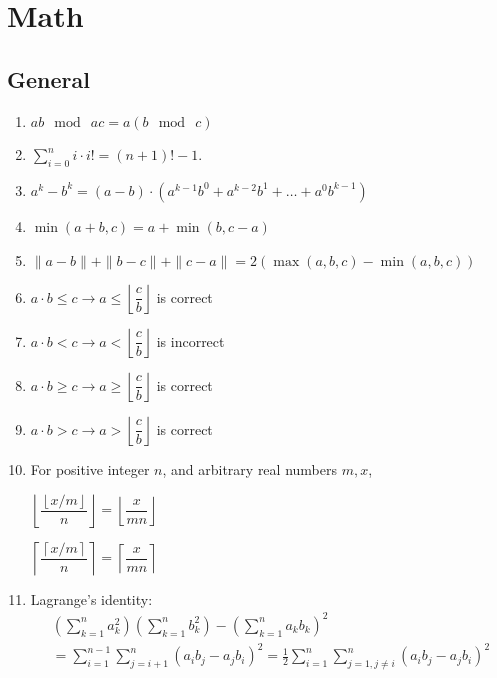 \section{Math}


\subsection{General}
\begin{enumerate}
\item $\displaystyle ab \mod\ ac=a(b \mod\ c)$
\item $\displaystyle \sum_{i = 0}^n{i\cdot i!=(n + 1)! - 1}$.
\item $\displaystyle a^k - b^k = (a - b) \cdot (a^{k - 1}b^0 + a^{k - 2}b^1 +  \ldots  + a^0b^{k - 1})$
\item $\displaystyle \min(a + b, c) = a + \min(b, c - a)$
\item $\|a - b\| + \|b - c\| + \|c - a\| = 2 (\max (a, b, c) - \min (a, b, c))$
\item $\displaystyle a \cdot b \leq c \rightarrow a \leq \left \lfloor \dfrac{c}{b} \right \rfloor$ is correct
\item $\displaystyle a \cdot b < c \rightarrow a <  \left \lfloor \dfrac{c}{b} \right \rfloor$ is incorrect
\item $\displaystyle a \cdot b \geq c \rightarrow a \geq  \left \lfloor \dfrac{c}{b} \right \rfloor$  is correct
\item $\displaystyle a \cdot b > c \rightarrow a >  \left \lfloor \dfrac{c}{b} \right \rfloor$ is correct
\item For positive integer $n$, and arbitrary real numbers $m,x$,
    
    $\displaystyle \left \lfloor \dfrac{\left \lfloor x/m \right \rfloor}{n} \right \rfloor = \left \lfloor \dfrac{x}{mn} \right \rfloor$
    
    $\displaystyle \left \lceil \dfrac{\left \lceil x/m \right \rceil}{n} \right \rceil = \left \lceil \dfrac{x}{mn} \right \rceil$
\item Lagrange's identity:
    \begin{multline*}
        \left(\sum \limits_{k=1}^{n}a_{k}^{2}\right)\left(\sum \limits_{k=1}^{n}b_{k}^{2}\right)-\left(\sum\limits_{k=1}^{n}a_{k}b_{k}\right)^{2}\\=\sum \limits_{i=1}^{n-1}\sum \limits_{j=i+1}^{n}\left(a_{i}b_{j}-a_{j}b_{i}\right)^{2}={\frac {1}{2}}\sum \limits_{i=1}^{n}\sum \limits_{j=1,j\neq i}^{n}(a_{i}b_{j}-a_{j}b_{i})^{2}
    \end{multline*}
    

\end{enumerate}
